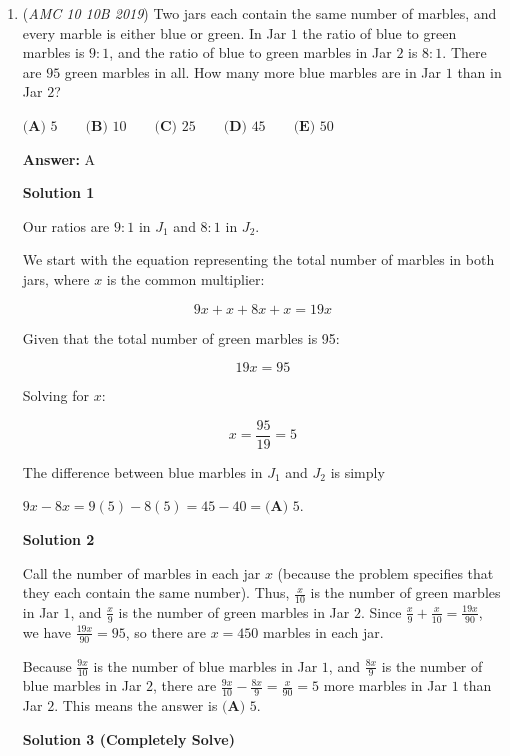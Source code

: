 \begin{enumerate}
 


	\item (\textit{AMC 10 10B 2019}) Two jars each contain the same number of marbles, and every marble is either blue or green. In Jar $1$ the ratio of blue to green marbles is $9:1$, and the ratio of blue to green marbles in Jar $2$ is $8:1$. There are $95$ green marbles in all. How many more blue marbles are in Jar $1$ than in Jar $2$?


 $\textbf{(A) } 5 \qquad\textbf{(B) } 10 \qquad\textbf{(C) } 25 \qquad\textbf{(D) } 45 \qquad\textbf{(E) } 50$

 \textbf{Answer: }A



\textbf{Solution 1}

Our ratios are $9:1$ in \( J_1 \) and $8:1$ in \( J_2 \).

 We start with the equation representing the total number of marbles in both jars, where \( x \) is the common multiplier:

 
 \[9x + x + 8x + x = 19x\]

 
Given that the total number of green marbles is 95:

 
 \[19x = 95\]

 Solving for \( x \):

 
 \[x = \frac{95}{19} = 5\]

 The difference between blue marbles in \( J_1 \) and \( J_2 \) is simply 

 $9x-8x=9(5)-8(5)=45-40=$$\boxed{\textbf{(A) } 5}$.

 


 



\textbf{Solution 2}

Call the number of marbles in each jar $x$ (because the problem specifies that they each contain the same number). Thus, $\frac{x}{10}$ is the number of green marbles in Jar $1$, and $\frac{x}{9}$ is the number of green marbles in Jar $2$. Since $\frac{x}{9}+\frac{x}{10}=\frac{19x}{90}$, we have $\frac{19x}{90}=95$, so there are $x=450$ marbles in each jar. 

 Because $\frac{9x}{10}$ is the number of blue marbles in Jar $1$, and $\frac{8x}{9}$ is the number of blue marbles in Jar $2$, there are $\frac{9x}{10}-\frac{8x}{9}=\frac{x}{90} = 5$ more marbles in Jar $1$ than Jar $2$. This means the answer is $\boxed{\textbf{(A) } 5}$.

 



\textbf{Solution 3 (Completely Solve)}


\end{enumerate}
